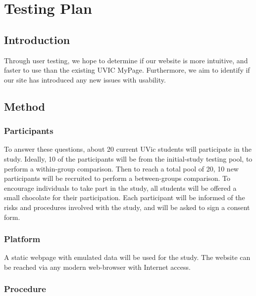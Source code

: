 \documentclass{article}
\begin{document}

\section{Testing Plan}

\subsection{Introduction}

Through user testing, we hope to determine if our website is more intuitive, and faster to use than the existing UVIC MyPage. Furthermore, we aim to identify if our site has introduced any new issues with usability.

\subsection{Method}

\subsubsection{Participants}

To answer these questions, about 20 current UVic students will participate in the study. Ideally, 10 of the participants will be from the initial-study testing pool, to perform a within-group comparison. Then to reach a total pool of 20, 10 new participants will be recruited to perform a between-groups comparison. To encourage individuals to take part in the study, all students will be offered a small chocolate for their participation. Each participant will be informed of the risks and procedures involved with the study, and will be asked to sign a consent form.

\subsubsection{Platform}

A static webpage with emulated data will be used for the study. The website can be reached via any modern web-browser with Internet access.

\subsubsection{Procedure}
\end{document}
